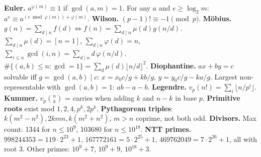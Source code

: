 {\small
\textbf{Euler.} $a^{\varphi(m)} \equiv 1$ if $\gcd(a, m) = 1$. For any $a$ and $e \ge \log_2 m$: $a^e \equiv a^{(e \bmod \varphi(m)) + \varphi(m)}$. \textbf{Wilson.} $(p-1)! \equiv -1 \pmod p$.
\textbf{M\"obius.} $g(n) = \sum_{d \mid n} f(d) \iff f(n) = \sum_{d \mid n} \mu(d) g(n/d)$. $\sum_{d \mid n} \mu(d) = [n = 1]$, $\sum_{d \mid n} \varphi(d) = n$, $\sum_{i \le n} \gcd(i, n) = \sum_{d \mid n} d\,\varphi(n/d)$. $\#\{(a, b) \le n : \gcd = 1\} = \sum_d \mu(d) \lfloor n/d \rfloor^2$.
\textbf{Diophantine.} $ax + by = c$ solvable iff $g = \gcd(a, b) \mid c$: $x = x_0 c/g + k b/g$, $y = y_0 c/g - k a/g$. Largest non-representable with $\gcd(a, b) = 1$: $ab - a - b$.
\textbf{Legendre.} $v_p(n!) = \sum_i \lfloor n/p^i \rfloor$. \textbf{Kummer.} $v_p\binom{n}{k}$ = carries when adding $k$ and $n - k$ in base $p$.
\textbf{Primitive roots} exist mod $1, 2, 4, p^k, 2p^k$. \textbf{Pythagorean triples}: $k(m^2 - n^2), 2kmn, k(m^2 + n^2)$, $m > n$ coprime, not both odd.
\textbf{Divisors.} Max count: 1344 for $n \le 10^9$, 103680 for $n \le 10^{18}$.
\textbf{NTT primes.} $998244353 = 119 \cdot 2^{23} + 1$, $167772161 = 5 \cdot 2^{25} + 1$, $469762049 = 7 \cdot 2^{26} + 1$, all with root 3. Other primes: $10^9 + 7$, $10^9 + 9$, $10^{18} + 3$.
\par}
